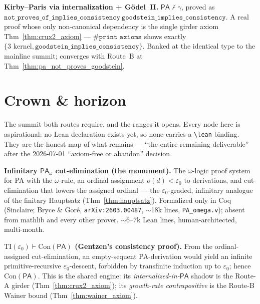 \begin{theorem}\label{thm:routeA_headline}
  \notready
\textbf{Kirby--Paris via internalization + Gödel~II.}  \(\mathsf{PA}\nvdash\gamma\), proved as
\(\texttt{not\_proves\_of\_implies\_consistency}\ \texttt{goodstein\_implies\_consistency}\).  A real
proof whose only non-canonical dependency is the single girder axiom Thm~\ref{thm:crux2_axiom} ---
\(\texttt{\#print axioms}\) shows exactly \(\{\text{3 kernel}, \texttt{goodstein\_implies\_consistency}\}\).
Banked at the identical type to the mainline summit; converges with Route~B at
Thm~\ref{thm:pa_not_proves_goodstein}.
\end{theorem}


\chapter{Crown \& horizon}\label{chp:crown}

The summit both routes require, and the ranges it opens.  Every node here is aspirational: no Lean
declaration exists yet, so none carries a \texttt{\textbackslash lean} binding.  They are the honest map
of what remains --- ``the entire remaining deliverable'' after the 2026-07-01 ``axiom-free or abandon''
decision.

\begin{theorem}\label{thm:infinitary_tower}
  \notready
\textbf{Infinitary \(\mathsf{PA}_\omega\) cut-elimination (the monument).}  The \(\omega\)-logic
proof system for PA with the \(\omega\)-rule, an ordinal assignment \(o(d)<\varepsilon_0\) to derivations,
and cut-elimination that lowers the assigned ordinal --- the \(\varepsilon_0\)-graded, infinitary
analogue of the finitary Hauptsatz (Thm~\ref{thm:hauptsatz}).  Formalized only in Coq
(Sinclaire; Bryce \& Goré, \texttt{arXiv:2603.00487}, \(\sim\)18k lines, \texttt{PA\_omega.v}); absent
from mathlib and every other prover.  \(\sim\)6--7k Lean lines, human-architected, multi-month.
\end{theorem}

\begin{theorem}\label{thm:gentzen_conpa}
  \notready
\textbf{\(\mathrm{TI}(\varepsilon_0)\vdash\mathrm{Con}(\mathsf{PA})\) (Gentzen's consistency proof).}
From the ordinal-assigned cut-elimination, an empty-sequent PA-derivation would yield an infinite
primitive-recursive \(\varepsilon_0\)-descent, forbidden by transfinite induction up to
\(\varepsilon_0\); hence \(\mathrm{Con}(\mathsf{PA})\).  This is the shared engine: its
\emph{internalized-in-\(\mathsf{PA}\)} shadow is the Route-A girder (Thm~\ref{thm:crux2_axiom}); its
\emph{growth-rate contrapositive} is the Route-B Wainer bound (Thm~\ref{thm:wainer_axiom}).
\end{theorem}

